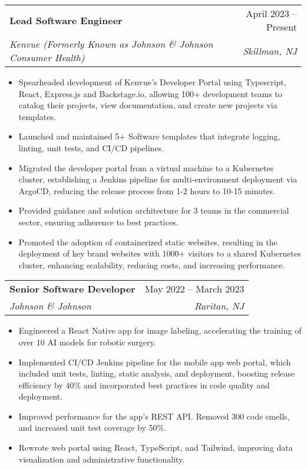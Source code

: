 \documentclass[letterpaper,11pt]{article}
\makeatletter
\newcommand{\resumeItem}[1]{
  \item\small{
    {#1 \vspace{-2pt}}
  }
}
\newcommand{\resumeSubheading}[4]{
  \vspace{-1pt}\item
    \begin{tabular*}{0.99\textwidth}[t]{l@{\extracolsep{\fill}}r}
      \textbf{#1} & #2 \\
      \textit{\small#3} & \textit{\small #4} \\
    \end{tabular*}\vspace{-7pt}
}
\newcommand{\resumeItemListStart}{\begin{itemize}}
\newcommand{\resumeItemListEnd}{\end{itemize}\vspace{-10pt}}
\makeatother
\begin{document}
    \resumeSubheading
      {Lead Software Engineer}{April 2023 -- Present}
      {Kenvue (Formerly Known as Johnson \& Johnson Consumer Health)}{Skillman, NJ}
      \resumeItemListStart[leftmargin=0.15in]
        \resumeItem{Spearheaded development of Kenvue's Developer Portal using Typescript, React, Express.js and Backstage.io, allowing 100+ development teams to catalog their projects, view documentation, and create new projects via templates. }
        \resumeItem{Launched and maintained 5+ Software templates that integrate logging, linting, unit tests, and CI/CD pipelines.}
        \resumeItem{Migrated the developer portal from a virtual machine to a Kubernetes cluster, establishing a Jenkins pipeline for multi-environment deployment via ArgoCD, reducing the release process from 1-2 hours to 10-15 minutes.}
        \resumeItem{Provided guidance and solution architecture for 3 teams in the commercial sector, ensuring adherence to best practices.}
        \resumeItem{Promoted the adoption of containerized static websites, resulting in the deployment of key brand websites with 1000+ visitors to a shared Kubernetes cluster, enhancing scalability, reducing costs, and increasing performance. }
    \resumeItemListEnd

    \resumeSubheading
      {Senior Software Developer}{May 2022 -- March 2023}
      {Johnson \& Johnson}{Raritan, NJ}
      \resumeItemListStart[leftmargin=0.15in]
        \resumeItem{Engineered a React Native app for image labeling, accelerating the training of over 10 AI models for robotic surgery.}
        \resumeItem{Implemented CI/CD Jenkins pipeline for the mobile app web portal, which included unit tests, linting, static analysis, and deployment, boosting release efficiency by 40\% and incorporated best practices in code quality and deployment.}
        \resumeItem{Improved performance for the app's REST API. Removed 300 code smells, and increased unit test coverage by 50\%.}
        \resumeItem{Rewrote web portal using React, TypeScript, and Tailwind, improving data visualization and administrative functionality.}
      \resumeItemListEnd
\end{document}
